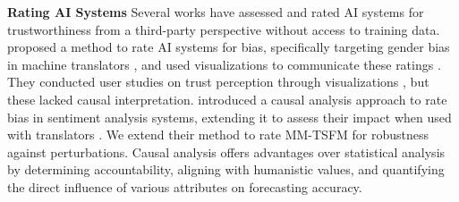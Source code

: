 

\noindent \textbf{Rating AI Systems} Several works have assessed and rated AI systems for trustworthiness from a third-party perspective without access to training data. \cite{srivastava2020rating} proposed a method to rate AI systems for bias, specifically targeting gender bias in machine translators \cite{srivastava2018towards}, and used visualizations to communicate these ratings \cite{bernagozzi2021vega}. They conducted user studies on trust perception through visualizations \cite{vega-userstudy-translatorbias}, but these lacked causal interpretation. \cite{kausik2024rating} introduced a causal analysis approach to rate bias in sentiment analysis systems, extending it to assess their impact when used with translators \cite{kausik2023the}. We extend their method to rate MM-TSFM for robustness against perturbations. Causal analysis offers advantages over statistical analysis by determining accountability, aligning with humanistic values, and quantifying the direct influence of various attributes on forecasting accuracy.

